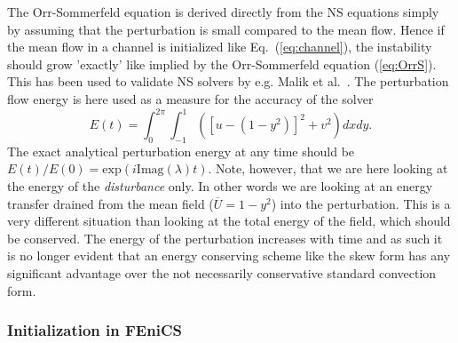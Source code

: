 The Orr-Sommerfeld equation is derived directly from the NS equations simply by assuming that the perturbation is small compared to the mean flow. Hence if the mean flow in a channel is initialized like Eq.~(\ref{eq:channel}), the instability should grow 'exactly' like implied by the Orr-Sommerfeld equation (\ref{eq:OrrS}). This has been used to validate NS solvers by e.g. Malik et al.~\cite{Malik1984}. The perturbation flow energy is here used as a measure for the accuracy of the solver
\begin{equation}
  E(t)= \int_0^{2\pi}\int_{-1}^{1} \left( \left[u-(1-y^2)\right]^2 + v^2 \right) dx dy.
\end{equation}
The exact analytical perturbation energy at any time should be $E(t)/E(0)=\text{exp}(i \text{Imag}(\lambda) t)$. Note, however, that we are here looking at the energy of the \textit{disturbance} only. In other words we are looking at an energy transfer drained from the mean field ($\overline{U}=1-y^2$) into the perturbation. This is a very different situation than looking at the total energy of the field, which should be conserved. The energy of the perturbation increases with time and as such it is no longer evident that an energy conserving scheme like the skew form has any significant advantage over the not necessarily conservative standard convection form.

\subsubsection{Initialization in FEniCS}

